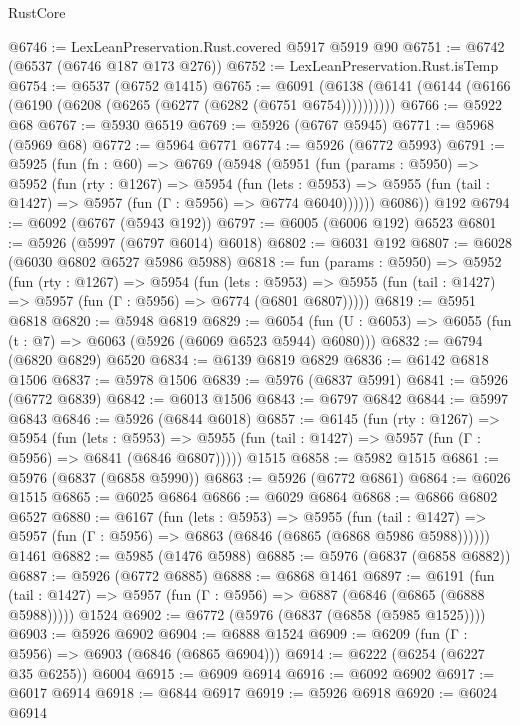 \begin{lexlean}{RustCore}
\begin{coremodule}
@6746 := LexLeanPreservation.Rust.covered @5917 @5919 @90
@6751 := @6742 (@6537 (@6746 @187 @173 @276))
@6752 := LexLeanPreservation.Rust.isTemp
@6754 := @6537 (@6752 @1415)
@6765 := @6091 (@6138 (@6141 (@6144 (@6166 (@6190 (@6208 (@6265 (@6277 (@6282 (@6751 @6754))))))))))
@6766 := @5922 @68
@6767 := @5930 @6519
@6769 := @5926 (@6767 @5945)
@6771 := @5968 (@5969 @68)
@6772 := @5964 @6771
@6774 := @5926 (@6772 @5993)
@6791 := @5925
    (fun (fn : @60) =>
    @6769
      (@5948
        (@5951
          (fun (params : @5950) =>
          @5952
            (fun (rty : @1267) =>
            @5954
              (fun (lets : @5953) =>
              @5955 (fun (tail : @1427) => @5957 (fun (Γ : @5956) => @6774 @6040))))))
        @6086))
    @192
@6794 := @6092 (@6767 (@5943 @192))
@6797 := @6005 (@6006 @192) @6523
@6801 := @5926 (@5997 (@6797 @6014) @6018)
@6802 := @6031 @192
@6807 := @6028 (@6030 @6802 @6527 @5986 @5988)
@6818 := fun (params : @5950) =>
  @5952
    (fun (rty : @1267) =>
    @5954
      (fun (lets : @5953) =>
      @5955 (fun (tail : @1427) => @5957 (fun (Γ : @5956) => @6774 (@6801 @6807)))))
@6819 := @5951 @6818
@6820 := @5948 @6819
@6829 := @6054 (fun (U : @6053) => @6055 (fun (t : @7) => @6063 (@5926 (@6069 @6523 @5944) @6080)))
@6832 := @6794 (@6820 @6829) @6520
@6834 := @6139 @6819 @6829
@6836 := @6142 @6818 @1506
@6837 := @5978 @1506
@6839 := @5976 (@6837 @5991)
@6841 := @5926 (@6772 @6839)
@6842 := @6013 @1506
@6843 := @6797 @6842
@6844 := @5997 @6843
@6846 := @5926 (@6844 @6018)
@6857 := @6145
    (fun (rty : @1267) =>
    @5954
      (fun (lets : @5953) =>
      @5955 (fun (tail : @1427) => @5957 (fun (Γ : @5956) => @6841 (@6846 @6807)))))
    @1515
@6858 := @5982 @1515
@6861 := @5976 (@6837 (@6858 @5990))
@6863 := @5926 (@6772 @6861)
@6864 := @6026 @1515
@6865 := @6025 @6864
@6866 := @6029 @6864
@6868 := @6866 @6802 @6527
@6880 := @6167
    (fun (lets : @5953) =>
    @5955
      (fun (tail : @1427) => @5957 (fun (Γ : @5956) => @6863 (@6846 (@6865 (@6868 @5986 @5988))))))
    @1461
@6882 := @5985 (@1476 @5988)
@6885 := @5976 (@6837 (@6858 @6882))
@6887 := @5926 (@6772 @6885)
@6888 := @6868 @1461
@6897 := @6191
    (fun (tail : @1427) => @5957 (fun (Γ : @5956) => @6887 (@6846 (@6865 (@6888 @5988)))))
    @1524
@6902 := @6772 (@5976 (@6837 (@6858 (@5985 @1525))))
@6903 := @5926 @6902
@6904 := @6888 @1524
@6909 := @6209 (fun (Γ : @5956) => @6903 (@6846 (@6865 @6904)))
@6914 := @6222 (@6254 (@6227 @35 @6255)) @6004
@6915 := @6909 @6914
@6916 := @6092 @6902
@6917 := @6017 @6914
@6918 := @6844 @6917
@6919 := @5926 @6918
@6920 := @6024 @6914

\end{coremodule}
\end{lexlean}
